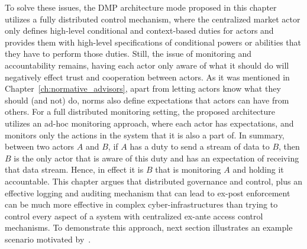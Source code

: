 To solve these issues, the DMP architecture mode proposed in this chapter utilizes a fully distributed control mechanism, where the centralized market actor only defines high-level conditional and context-based duties for actors and provides them with high-level specifications of conditional powers or abilities that they have to perform those duties. Still, the issue of monitoring and accountability remains, having each actor only aware of what it should do will negatively effect trust and cooperation between actors. As it was mentioned in Chapter~\ref{ch:normative_advisors}, apart from letting actors know what they should (and not) do, norms also define expectations that actors can have from others. For a full distributed monitoring setting, the proposed architecture utilizes an ad-hoc monitoring approach, where each actor has expectations, and monitors only the actions in the system that it is also a part of. In summary, between two actors $A$ and $B$, if $A$ has a duty to send a stream of data to $B$, then $B$ is the only actor that is aware of this duty and has an expectation of receiving that data stream. Hence, in effect it is $B$ that is monitoring $A$ and holding it accountable. This chapter argues that distributed governance and control, plus an effective logging and auditing mechanism that can lead to ex-post enforcement can be much more effective in complex cyber-infrastructures than trying to control every aspect of a system with centralized ex-ante access control mechanisms. To demonstrate this approach, next section illustrates an example scenario motivated by~\cite{Zhang2019ModelingPlaces}.

